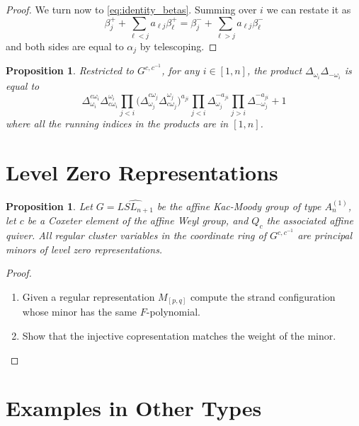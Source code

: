 \documentclass[11pt]{amsart}
\newtheorem{proposition}[theorem]{Proposition}
\numberwithin{equation}{section}
\begin{document}
\begin{proof}
  We turn now to \cref{eq:identity_betas}.
  Summing over $i$ we can restate it as
  \begin{equation}
    \beta_j^++\sum_{\ell<j}a_{\ell j}\beta_\ell^+
    =
    \beta_j^-+\sum_{\ell>j}a_{\ell j}\beta_\ell^-
  \end{equation}
  and both sides are equal to $\alpha_j$ by telescoping.
\end{proof}

\begin{proposition}
  Restricted to $G^{c,c^{-1}}$, for any $i\in[1,n]$, the product $\Delta_{\omega_i}\Delta_{-\omega_i}$ is equal to
  \begin{equation} 
    \Delta^{c \omega_i}_{\omega_i}
    \Delta^{\omega_i}_{ c\omega_i} 
    \prod_{j<i}\big(
      \Delta^{c \omega_j}_{\omega_j} 
      \Delta^{\omega_j}_{c \omega_j}
    \big)^{a_{j i}}
    \prod_{j<i}\Delta_{\omega_j}^{-a_{ji}}
    \prod_{j>i}\Delta_{-\omega_j}^{-a_{ji}}
    +1
  \end{equation}
  where all the running indices in the products are in $[1,n]$.
\end{proposition}

\section{Level Zero Representations}

\begin{proposition}
Let $G = \widehat{LSL_{n+1}}$ be the affine Kac-Moody group of type $A_n^{(1)}$, let $c$ be a Coxeter element of the affine Weyl group, and $Q_c$ the associated affine quiver.  All regular cluster variables in the coordinate ring of $G^{c,c^{-1}}$ are principal minors of level zero representations.  
\end{proposition}
\begin{proof}
\begin{enumerate}
\item Given a regular representation $M_{[p,q]}$ compute the strand configuration whose minor has the same $F$-polynomial.
\item Show that the injective copresentation matches the weight of the minor.
\end{enumerate}
\end{proof}

\section{Examples in Other Types}
\end{document}
